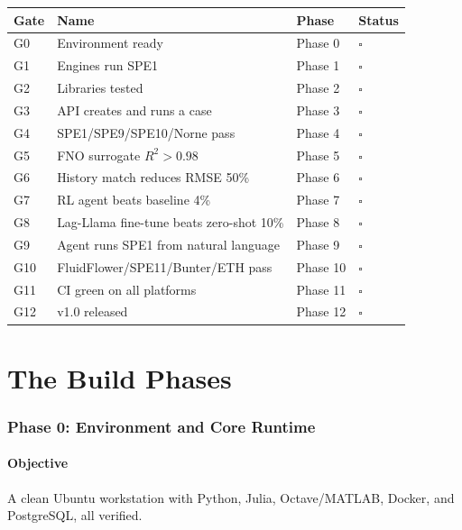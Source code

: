 \documentclass[10pt,a4paper]{article}
\begin{document}
\begin{longtable}{@{}p{1.2cm}p{6.8cm}p{2.4cm}p{3.2cm}@{}}
\toprule
\textbf{Gate} & \textbf{Name} & \textbf{Phase} & \textbf{Status}\\
\midrule
\endhead
G0 & Environment ready & Phase 0 & $\square$\\
G1 & Engines run SPE1 & Phase 1 & $\square$\\
G2 & Libraries tested & Phase 2 & $\square$\\
G3 & API creates and runs a case & Phase 3 & $\square$\\
G4 & SPE1/SPE9/SPE10/Norne pass & Phase 4 & $\square$\\
G5 & FNO surrogate $R^2>0.98$ & Phase 5 & $\square$\\
G6 & History match reduces RMSE 50\% & Phase 6 & $\square$\\
G7 & RL agent beats baseline 4\% & Phase 7 & $\square$\\
G8 & Lag-Llama fine-tune beats zero-shot 10\% & Phase 8 & $\square$\\
G9 & Agent runs SPE1 from natural language & Phase 9 & $\square$\\
G10 & FluidFlower/SPE11/Bunter/ETH pass & Phase 10 & $\square$\\
G11 & CI green on all platforms & Phase 11 & $\square$\\
G12 & v1.0 released & Phase 12 & $\square$\\
\bottomrule
\end{longtable}

\part{The Build Phases}

\section{Phase 0: Environment and Core Runtime}
\label{sec:phase0}

\subsection{Objective}
A clean Ubuntu workstation with Python, Julia, Octave/MATLAB, Docker, and PostgreSQL, all verified.
\end{document}
